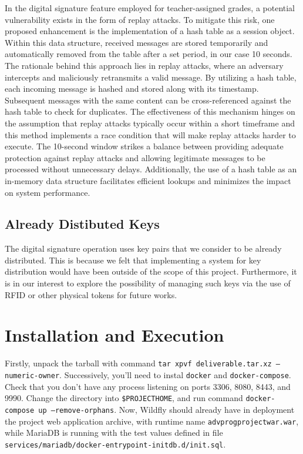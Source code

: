 In the digital signature feature employed for teacher-assigned grades, a potential vulnerability exists in the form of replay attacks. To mitigate this risk, one proposed enhancement is the implementation of a hash table as a session object. Within this data structure, received messages are stored temporarily and automatically removed from the table after a set period, in our case 10 seconds. The rationale behind this approach lies in replay attacks, where an adversary intercepts and maliciously retransmits a valid message. By utilizing a hash table, each incoming message is hashed and stored along with its timestamp. Subsequent messages with the same content can be cross-referenced against the hash table to check for duplicates. The effectiveness of this mechanism hinges on the assumption that replay attacks typically occur within a short timeframe and this method implements a race condition that will make replay attacks harder to execute. The 10-second window strikes a balance between providing adequate protection against replay attacks and allowing legitimate messages to be processed without unnecessary delays. Additionally, the use of a hash table as an in-memory data structure facilitates efficient lookups and minimizes the impact on system performance.

\section{Already Distibuted Keys}

The digital signature operation uses key pairs that we consider to be already distributed. This is because we felt that implementing a system for key distribution would have been outside of the scope of this project. Furthermore, it is in our interest to explore the possibility of managing such keys via the use of RFID or other physical tokens for future works.

\newpage
\chapter{Installation and Execution}

Firstly, unpack the tarball with command \texttt{tar xpvf deliverable.tar.xz --numeric-owner}. Successively, you'll need to instal \texttt{docker} and \texttt{docker-compose}. Check that you don't have any process listening on ports 3306, 8080, 8443, and 9990. Change the directory into \texttt{\$PROJECT\textunderscore HOME}, and run command \texttt{docker-compose up --remove-orphans}. Now, Wildfly should already have in deployment the project web application archive, with runtime name \texttt{adv\textunderscore prog\textunderscore project\textunderscore war.war}, while MariaDB is running with the test values defined in file \\\texttt{services/mariadb/docker-entrypoint-initdb.d/init.sql}.

